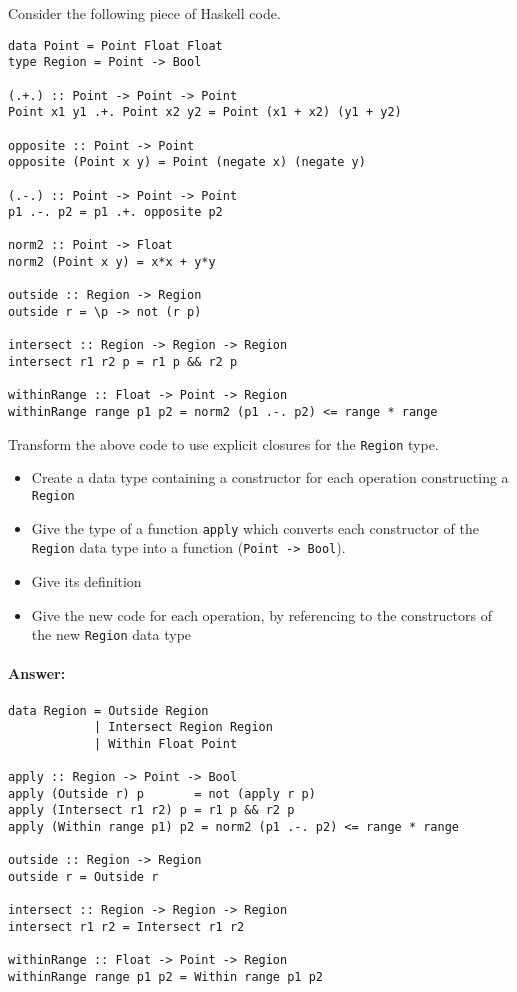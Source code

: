 \documentclass{article}
\newcommand{\answer}[0]{\paragraph{Answer:}}
\begin{document}
Consider the following piece of Haskell code.
\begin{verbatim}
data Point = Point Float Float
type Region = Point -> Bool

(.+.) :: Point -> Point -> Point
Point x1 y1 .+. Point x2 y2 = Point (x1 + x2) (y1 + y2)

opposite :: Point -> Point
opposite (Point x y) = Point (negate x) (negate y)

(.-.) :: Point -> Point -> Point
p1 .-. p2 = p1 .+. opposite p2

norm2 :: Point -> Float
norm2 (Point x y) = x*x + y*y

outside :: Region -> Region
outside r = \p -> not (r p)

intersect :: Region -> Region -> Region
intersect r1 r2 p = r1 p && r2 p

withinRange :: Float -> Point -> Region
withinRange range p1 p2 = norm2 (p1 .-. p2) <= range * range
\end{verbatim}

Transform the above code to use explicit closures for the
\texttt{Region} type.

\begin{itemize}
\item Create a data type containing a constructor for each operation constructing a \texttt{Region} 
\item Give the type of a function \texttt{apply} which converts each constructor of the \texttt{Region} data type into a function (\texttt{Point -> Bool}). 
\item Give its definition 
\item Give the new code for each operation, by referencing to the constructors of the new \texttt{Region} data type 
\end{itemize}

\answer{
  \begin{verbatim}
data Region = Outside Region
            | Intersect Region Region
            | Within Float Point

apply :: Region -> Point -> Bool
apply (Outside r) p       = not (apply r p)
apply (Intersect r1 r2) p = r1 p && r2 p
apply (Within range p1) p2 = norm2 (p1 .-. p2) <= range * range

outside :: Region -> Region
outside r = Outside r

intersect :: Region -> Region -> Region
intersect r1 r2 = Intersect r1 r2

withinRange :: Float -> Point -> Region
withinRange range p1 p2 = Within range p1 p2
  \end{verbatim}
}
\newpage
\end{document}
